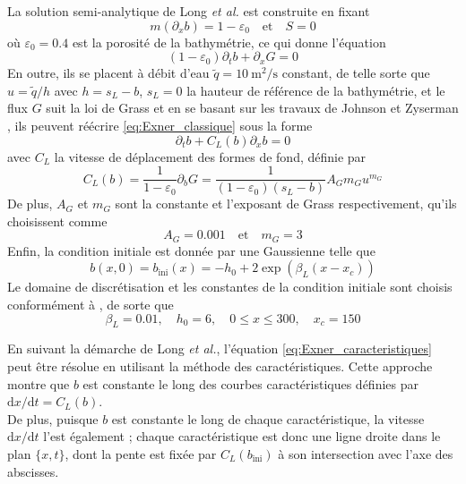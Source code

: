 \documentclass[11pt, a4paper, oneside]{report}
\begin{document}
\begin{samepage}
La solution semi-analytique de Long \textit{et al.} \cite{long2008numerical} est construite en fixant
\begin{equation}
    m(\partial_x b) = 1 - \varepsilon_0 \quad \text{et} \quad S = 0
\end{equation}
où $\varepsilon_0 = 0.4$ est la porosité de la bathymétrie, ce qui donne l'équation
\begin{equation} \label{eq:Exner_classique}
    (1 - \varepsilon_0) \partial_t b + \partial_x G = 0
\end{equation}
En outre, ils se placent à débit d'eau $\widetilde{q} = \SI{10}{\meter\squared\per\second}$ constant, de telle sorte que $u = \widetilde{q}/h$ avec $h = s_L - b$, $s_L = 0$ la hauteur de référence de la bathymétrie, et le flux $G$ suit la loi de Grass et en se basant sur les travaux de Johnson et Zyserman \cite{johnson2002controlling}, ils peuvent réécrire \eqref{eq:Exner_classique} sous la forme
\begin{equation} \label{eq:Exner_caracteristiques}
    \partial_t b + C_L(b) \partial_x b = 0
\end{equation}
avec $C_L$ la vitesse de déplacement des formes de fond, définie par
\begin{equation}
    C_L(b) = \frac{1}{1 - \varepsilon_0} \partial_b G = \frac{1}{(1 - \varepsilon_0) (s_L - b)} A_G m_G u^{m_G}
\end{equation}
De plus, $A_G$ et $m_G$ sont la constante et l'exposant de Grass respectivement, qu'ils choisissent comme
\begin{equation}
    A_G = 0.001 \quad \text{et} \quad m_G = 3
\end{equation}
Enfin, la condition initiale est donnée par une Gaussienne telle que
\begin{equation}
    b(x, 0) = b_\text{ini}(x) = -h_0 + 2 \exp \left( \beta_L (x - x_c) \right)
\end{equation}
Le domaine de discrétisation et les constantes de la condition initiale sont choisis conformément à \cite{long2008numerical}, de sorte que
\begin{equation}
    \beta_L = 0.01, \quad h_0 = 6, \quad 0 \leq x \leq 300, \quad x_c = 150
\end{equation}

En suivant la démarche de Long \textit{et al.}, l'équation \eqref{eq:Exner_caracteristiques} peut être résolue en utilisant la méthode des caractéristiques. Cette approche montre que $b$ est constante le long des courbes caractéristiques définies par $\text{d}x/\text{d}t = C_L(b)$. \\
De plus, puisque $b$ est constante le long de chaque caractéristique, la vitesse $\text{d}x/\text{d}t$ l'est également ; chaque caractéristique est donc une ligne droite dans le plan $\{x, t\}$, dont la pente est fixée par $C_L(b_\text{ini})$ à son intersection avec l'axe des abscisses.


\end{samepage}
\end{document}

